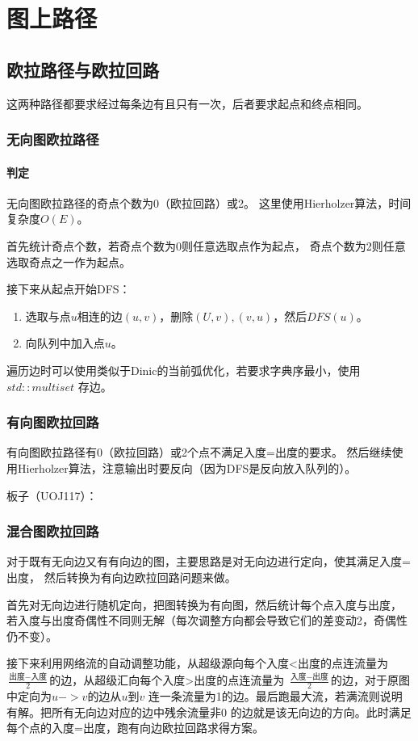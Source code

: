 \section{图上路径}
\subsection{欧拉路径与欧拉回路}
这两种路径都要求经过每条边有且只有一次，后者要求起点和终点相同。
\subsubsection{无向图欧拉路径}
\paragraph{判定} 无向图欧拉路径的奇点个数为0（欧拉回路）或2。
这里使用Hierholzer算法，时间复杂度$O(E)$。

首先统计奇点个数，若奇点个数为0则任意选取点作为起点，
奇点个数为2则任意选取奇点之一作为起点。

接下来从起点开始DFS：
\begin{enumerate}
    \item 选取与点$u$相连的边$(u,v)$，删除$(U,v),(v,u)$，然后$DFS(u)$。
    \item 向队列中加入点$u$。
\end{enumerate}
遍历边时可以使用类似于Dinic的当前弧优化，若要求字典序最小，使用$std::multiset$
存边。
\subsubsection{有向图欧拉回路}
有向图欧拉路径有0（欧拉回路）或2个点不满足入度=出度的要求。
然后继续使用Hierholzer算法，注意输出时要反向（因为DFS是反向放入队列的）。

板子（UOJ117）：

\subsubsection{混合图欧拉回路}
对于既有无向边又有有向边的图，主要思路是对无向边进行定向，使其满足入度=出度，
然后转换为有向边欧拉回路问题来做。

首先对无向边进行随机定向，把图转换为有向图，然后统计每个点入度与出度，
若入度与出度奇偶性不同则无解（每次调整方向都会导致它们的差变动2，奇偶性仍不变）。

接下来利用网络流的自动调整功能，从超级源向每个入度<出度的点连流量为
$\frac{\textrm{出度}-\textrm{入度}}{2}$的边，从超级汇向每个入度>出度的点连流量为
$\frac{\textrm{入度}-\textrm{出度}}{2}$的边，对于原图中定向为$u->v$的边从$u$到$v$
连一条流量为1的边。最后跑最大流，若满流则说明有解。把所有无向边对应的边中残余流量非0
的边就是该无向边的方向。此时满足每个点的入度=出度，跑有向边欧拉回路求得方案。

